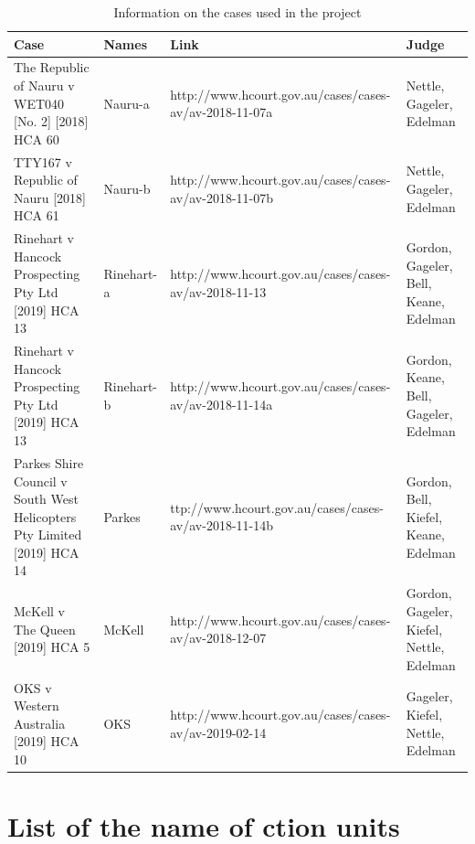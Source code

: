 \documentclass{monashthesis}
\begin{document}
\begin{table}[ht]
\begin{center}
\caption{\label{tab:case-info} Information on the cases used in the project}
\begin{tabular}{llll}
\toprule
Case & Names & Link & Judge \\
\midrule
The Republic of Nauru v WET040 [No. 2] [2018] HCA 60 & Nauru-a & http://www.hcourt.gov.au/cases/cases-av/av-2018-11-07a & Nettle, Gageler, Edelman \\
TTY167 v Republic of Nauru [2018] HCA 61 & Nauru-b & http://www.hcourt.gov.au/cases/cases-av/av-2018-11-07b & Nettle, Gageler, Edelman \\
Rinehart v Hancock Prospecting Pty Ltd [2019] HCA 13 & Rinehart-a & http://www.hcourt.gov.au/cases/cases-av/av-2018-11-13 & Gordon, Gageler, Bell, Keane, Edelman \\
Rinehart v Hancock Prospecting Pty Ltd [2019] HCA 13 & Rinehart-b & http://www.hcourt.gov.au/cases/cases-av/av-2018-11-14a & Gordon, Keane, Bell, Gageler, Edelman \\
Parkes Shire Council v South West Helicopters Pty Limited [2019] HCA 14 & Parkes & ttp://www.hcourt.gov.au/cases/cases-av/av-2018-11-14b & Gordon, Bell, Kiefel, Keane, Edelman \\
McKell v The Queen [2019] HCA 5 & McKell & http://www.hcourt.gov.au/cases/cases-av/av-2018-12-07 & Gordon, Gageler, Kiefel, Nettle, Edelman \\
OKS v Western Australia [2019] HCA 10 & OKS & http://www.hcourt.gov.au/cases/cases-av/av-2019-02-14 & Gageler, Kiefel, Nettle, Edelman \\
\bottomrule
\end{tabular}
\end{center}
\end{table}

\hypertarget{list-of-the-name-of-ction-units}{%
\section{List of the name of ction units}\label{list-of-the-name-of-ction-units}}
\end{document}
